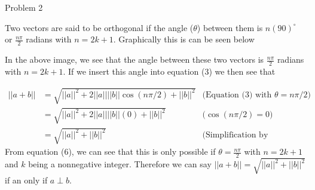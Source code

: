 \begin{problem}{Problem 2}
\begin{Highlight}
        Two vectors are said to be orthogonal if the angle ($\theta$) between them is $n (90)^{\circ}$ or $\frac{n\pi}{2}$ radians with $n = 2k + 1$. Graphically this is can be seen below

        \begin{center}
            \hspace*{10pt}
        \end{center}

        In the above image, we see that the angle between these two vectors is $\frac{n\pi}{2}$ radians with $n = 2k + 1$. If we insert this angle into equation (3) we then see that

        \begin{align}
            ||a + b|| & = \sqrt{||a||^{2} + 2||a||||b||\cos{(n\pi / 2)} + ||b||^2} & \text{(Equation (3) with $\theta = n\pi / 2$)} \\
            & = \sqrt{||a||^{2} + 2||a||||b||(0) + ||b||^2} & \text{($\cos{(n\pi / 2)} = 0$)} \\
            & = \sqrt{||a||^{2} + ||b||^2} & \text{(Simplification by multiplication)}
        \end{align}
        From equation (6), we can see that this is only possible if $\theta = \frac{n\pi}{2}$ with $n = 2k + 1$ and $k$ being a nonnegative integer. Therefore we can say $||a+b|| = \sqrt{||a||^{2} + ||b||^{2}}$
        if an only if $a \perp b$. 
    \end{Highlight}


\end{problem}

